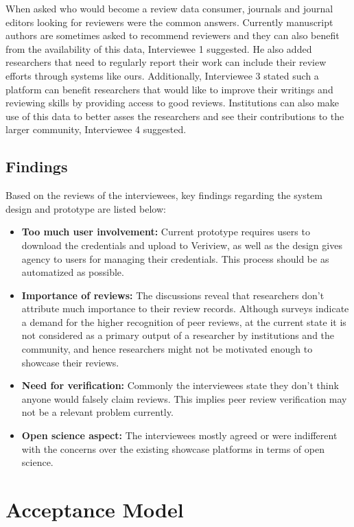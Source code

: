 When asked who would become a review data consumer, journals and journal editors looking for reviewers were the common answers. Currently manuscript authors are sometimes asked to recommend reviewers and they can also benefit from the availability of this data, Interviewee 1 suggested. He also added researchers that need to regularly report their work can include their review efforts through systems like ours. Additionally, Interviewee 3 stated such a platform can benefit researchers that would like to improve their writings and reviewing skills by providing access to good reviews. Institutions can also make use of this data to better asses the researchers and see their contributions to the larger community, Interviewee 4 suggested.

\subsection{Findings}

Based on the reviews of the interviewees, key findings regarding the system design and prototype are listed below: 

\begin{itemize}
    \item \textbf{Too much user involvement:} Current prototype requires users to download the credentials and upload to Veriview, as well as the design gives agency to users for managing their credentials. This process should be as automatized as possible.
    \item \textbf{Importance of reviews:} The discussions reveal that researchers don't attribute much importance to their review records. Although surveys indicate a demand for the higher recognition of peer reviews, at the current state it is not considered as a primary output of a researcher by institutions and the community, and hence researchers might not be motivated enough to showcase their reviews.
    \item \textbf{Need for verification:} Commonly the interviewees state they don't think anyone would falsely claim reviews. This implies peer review verification may not be a relevant problem currently. 
    \item \textbf{Open science aspect:} The interviewees mostly agreed or were indifferent with the concerns over the existing showcase platforms in terms of open science. 
\end{itemize}

\section{Acceptance Model}

